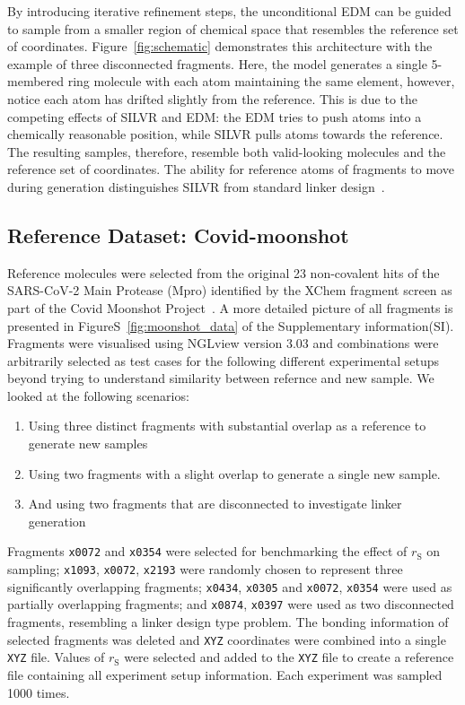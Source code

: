 \documentclass[journal=jacsat,manuscript=article]{achemso}
\begin{document}
By introducing iterative refinement steps, the unconditional EDM can be guided to sample from a smaller region of chemical space that resembles the reference set of coordinates. Figure~\ref{fig:schematic} demonstrates this architecture with the example of three disconnected fragments. Here, the model generates a single 5-membered ring molecule with each atom maintaining the same element, however, notice each atom has drifted slightly from the reference. This is due to the competing effects of SILVR and EDM: the EDM tries to push atoms into a chemically reasonable position, while SILVR pulls atoms towards the reference. The resulting samples, therefore, resemble both valid-looking molecules and the reference set of coordinates. The ability for reference atoms of fragments to move during generation distinguishes SILVR from standard linker design~\cite{guo2023linkinvent, igashov2022equivariant}.

\subsection{Reference Dataset: Covid-moonshot}
Reference molecules were selected from the original 23 non-covalent hits of the SARS-CoV-2 Main Protease (Mpro) identified by the XChem fragment screen as part of the Covid Moonshot Project~\cite{consortium2023open, consortium2021open}. A more detailed picture of all fragments is presented in FigureS~\ref{fig:moonshot_data} of the Supplementary information(SI). Fragments were visualised using NGLview version 3.03 and combinations were arbitrarily selected as test cases for the following different experimental setups beyond trying to understand similarity between refernce and new sample. We looked at the following scenarios:
\begin{enumerate}
    \item Using three distinct fragments with substantial overlap as a reference to generate new samples
    \item Using two fragments with a slight overlap to generate a single new sample.
    \item And using two fragments that are disconnected to investigate linker generation
\end{enumerate}
Fragments \texttt{x0072} and \texttt{x0354} were selected for benchmarking the effect of $r_{\mathrm{S}}$ on sampling; \texttt{x1093}, \texttt{x0072}, \texttt{x2193} were randomly chosen to represent three significantly overlapping fragments; \texttt{x0434}, \texttt{x0305} and \texttt{x0072}, \texttt{x0354} were used as partially overlapping fragments; and \texttt{x0874}, \texttt{x0397} were used as two disconnected fragments, resembling a linker design type problem. The bonding information of selected fragments was deleted and \texttt{XYZ} coordinates were combined into a single \texttt{XYZ} file. Values of $r_{\mathrm{S}}$ were selected and added to the \texttt{XYZ} file to create a reference file containing all experiment setup information. Each experiment was sampled 1000 times. 
\end{document}
